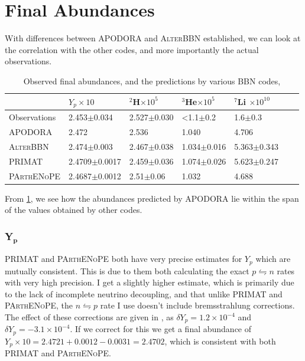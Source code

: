 \section{Final Abundances}
\label{sec:finalabun}
With differences between APODORA and \textsc{AlterBBN} established, we can look at the correlation with the other codes, and more importantly the actual observations. 
\begin{table}[ht]
    \begin{tabular}{l|llllll}
               & $Y_p \times 10$ & \hspace{-0.34em}$^{2}$H$ \times 10^{5}$ & \hspace{-0.34em}$^{3}$He$ \times 10^{5}$ & \hspace{-0.34em}$^{7}$Li $ \times 10^{10}$\\ \hline
    Observations  & 2.453$\pm$0.034    & 2.527$\pm$0.030 & <1.1$\pm$0.2 & 1.6$\pm$0.3    \\ \hline
    APODORA  & 2.472            & 2.536 & 1.040 & 4.706     \\ \hline
    \textsc{AlterBBN} & 2.474$\pm$0.003 & 2.467$\pm$0.038 & 1.034$\pm$0.016 & 5.363$\pm$0.343    \\ \hline
    PRIMAT & 2.4709$\pm$0.0017   & 2.459$\pm$0.036 & 1.074$\pm$0.026 & 5.623$\pm$0.247   \\ \hline
    \textsc{PArthENoPE}& 2.4687$\pm$0.0012     & 2.51$\pm$0.06 & 1.032  & 4.688      
    \end{tabular}
    \caption{Observed final abundances\cite{Yp_Aver_2021}\cite{deuterium_Cooke_2018}\cite{Allobsabun}, and the predictions by various BBN codes\cite{AlterBBN}\cite{PRIMAT}\cite{PArthENoPE},}
    \label{tab:Obsabun}
\end{table}
From \cref{tab:Obsabun}, we see how the abundances predicted by APODORA lie within the span of the values obtained by other codes. 

\subsubsection{Y$_\textbf{p}$}
PRIMAT and \textsc{PArthENoPE} both have very precise estimates for $Y_p$ which are mutually consistent. This is due to them both calculating the exact $p\leftrightharpoons n$ rates with very high precision. I get a slightly higher estimate, which is primarily due to the lack of incomplete neutrino decoupling, and that unlike PRIMAT and \textsc{PArthENoPE}, the $n \leftrightharpoons p$ rate I use doesn't include bremsstrahlung corrections\cite{Serpico_2004}. The effect of these corrections are given in \textcite[table V]{PRIMAT}, as $\delta Y_p = 1.2\times10^{-4}$ and $\delta Y_p = -3.1\times10^{-4}$. If we correct for this we get a final abundance of $Y_p\times 10 = 2.4721+0.0012-0.0031=2.4702$, which is consistent with both PRIMAT and \textsc{PArthENoPE}.

